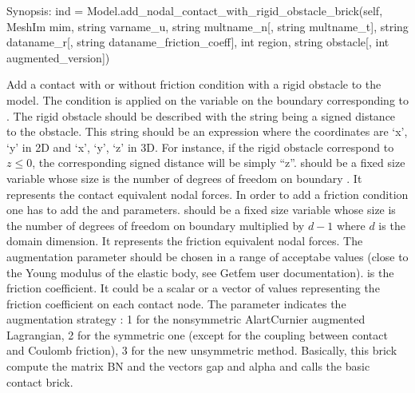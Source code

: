 \documentclass[a4paper,11pt,english]{sphinxmanual}
\begin{document}
\begin{fulllineitems}

\begin{fulllineitems}
\label{\detokenize{python/cmdref_Model:getfem.Model.add_nodal_contact_with_rigid_obstacle_brick}}
Synopsis: ind = Model.add\_nodal\_contact\_with\_rigid\_obstacle\_brick(self,  MeshIm mim, string varname\_u, string multname\_n{[}, string multname\_t{]}, string dataname\_r{[}, string dataname\_friction\_coeff{]}, int region, string obstacle{[},  int augmented\_version{]})

Add a contact with or without friction condition with a rigid obstacle
to the model. The condition is applied on the variable 
on the boundary corresponding to . The rigid obstacle should
be described with the string  being a signed distance to
the obstacle. This string should be an expression where the coordinates
are ‘x’, ‘y’ in 2D and ‘x’, ‘y’, ‘z’ in 3D. For instance, if the rigid
obstacle correspond to \(z \le 0\), the corresponding signed distance
will be simply “z”.  should be a fixed size variable whose size
is the number of degrees of freedom on boundary . It represents the
contact equivalent nodal forces. In order to add a friction condition
one has to add the  and  parameters.
 should be a fixed size variable whose size is
the number of degrees of freedom on boundary  multiplied by
\(d-1\) where \(d\) is the domain dimension. It represents
the friction equivalent nodal forces.
The augmentation parameter  should be chosen in a
range of acceptabe values (close to the Young modulus of the elastic
body, see Getfem user documentation).   is
the friction coefficient. It could be a scalar or a vector of values
representing the friction coefficient on each contact node. 
The parameter 
indicates the augmentation strategy : 1 for the non\sphinxhyphen{}symmetric
Alart\sphinxhyphen{}Curnier augmented Lagrangian, 2 for the symmetric one (except for
the coupling between contact and Coulomb friction),
3 for the new unsymmetric method.
Basically, this brick compute the matrix BN
and the vectors gap and alpha and calls the basic contact brick.


\end{fulllineitems}
\end{fulllineitems}
\end{document}
